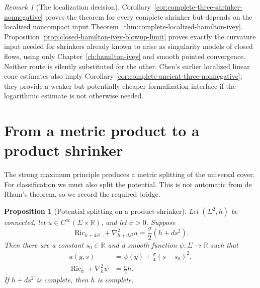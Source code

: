 \documentclass[10pt]{coll-l}
\newcommand{\R}{\mathbb{R}}
\newtheorem{proposition}[theorem]{Proposition}
\theoremstyle{definition}
\theoremstyle{remark}
\newtheorem{remark}[theorem]{Remark}
\numberwithin{section}{chapter}
\numberwithin{equation}{chapter}
\newcommand{\Ric}{\operatorname{Ric}}
\begin{document}
\begin{remark}[The localization decision]
\label{rem:shrinker-localization-decision}
Corollary~\ref{cor:complete-three-shrinker-nonnegative} proves the theorem
for every complete shrinker but depends on the localized noncompact input
Theorem~\ref{thm:complete-localized-hamilton-ivey}.  Proposition
\ref{prop:closed-hamilton-ivey-blowup-limit} proves exactly the curvature
input needed for shrinkers already known to arise as singularity models of
closed flows, using only Chapter~\ref{ch:hamilton-ivey} and smooth pointed
convergence.  Neither route is silently substituted for the other.
Chen's earlier localized linear cone estimates also imply Corollary
\ref{cor:complete-ancient-three-nonnegative}; they provide a weaker but
potentially cheaper formalization interface if the logarithmic estimate is
not otherwise needed.
\end{remark}

\section{From a metric product to a product shrinker}
\label{sec:shrinker-product-potential}

The strong maximum principle produces a metric splitting of the universal
cover.  For classification we must also split the potential.  This is not
automatic from de Rham's theorem, so we record the required bridge.

\begin{proposition}[Potential splitting on a product shrinker]
\label{prop:product-shrinker-potential-splitting}
Let $(\Sigma^2,h)$ be connected, let $u\in C^\infty(\Sigma\times\R)$, and
let $\sigma>0$.  Suppose
\begin{equation}
 \Ric_{h+ds^2}+\nabla_{h+ds^2}^2u
       =\frac\sigma2(h+ds^2).                            \label{eq:product-shrinker-equation}
\end{equation}
Then there are a constant $s_0\in\R$ and a smooth function
$\psi:\Sigma\to\R$ such that
\begin{align}
 u(y,s)&=\psi(y)+\frac\sigma4(s-s_0)^2,                  \label{eq:product-shrinker-potential-split}\\
 \Ric_h+\nabla_h^2\psi&=\frac\sigma2h.                  \label{eq:surface-factor-shrinker-equation}
\end{align}
If $h+ds^2$ is complete, then $h$ is complete.
\end{proposition}
\end{document}
